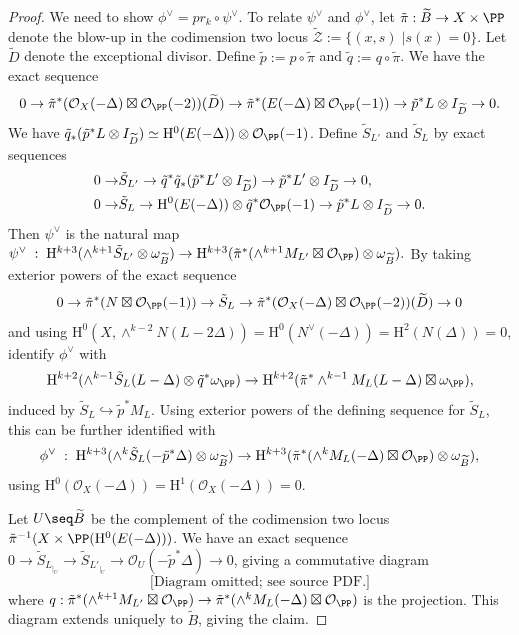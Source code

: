 \begin{proof}
We need to show $\phi^{\vee}=pr_k \circ \psi^{\vee}$. To relate $\psi^{\vee}$ and $\phi^{\vee}$, let $\tilde{\pi}: \widetilde{B} \to X \times \PP$ denote the blow-up in the codimension two locus $\widetilde{\mathcal{Z}}:=\{ (x,s) \; | s(x)=0 \}$. Let $\widetilde{D}$ denote the exceptional divisor. Define $\tilde{p}:=p \circ \tilde{\pi}$ and $\tilde{q}:=q \circ \tilde{\pi}$. We have the exact sequence
$$0 \to \tilde{\pi}^*(\mathcal{O}_X(-\Delta) \boxtimes \mathcal{O}_{\PP}(-2))(\widetilde{D}) \to \tilde{\pi}^*(E(-\Delta) \boxtimes \mathcal{O}_{\PP}(-1)) \to {\tilde{p}}^* L \otimes I_{\widetilde{D}} \to 0.$$
We have $\tilde{q}_*({\tilde{p}}^* L \otimes I_{\widetilde{D}}) \simeq \mathrm{H}^0(E(-\Delta)) \otimes \mathcal{O}_{\PP}(-1)$. Define $\tilde{S}_{L'}$ and $\tilde{S}_L$ by exact sequences
{\small{\begin{align*}
0 \to &\tilde{S}_{L'} \to {\tilde{q}}^*{\tilde{q}}_*({\tilde{p}}^* {L'} \otimes I_{\widetilde{D}})  \to {\tilde{p}}^* L' \otimes I_{\widetilde{D}} \to 0, \\
0 \to &\tilde{S}_L \to \mathrm{H}^0(E(-\Delta)) \otimes {\tilde{q}}^*\mathcal{O}_{\PP}(-1) \to {\tilde{p}}^* L \otimes I_{\widetilde{D}} \to 0.
\end{align*}}}
Then $\psi^{\vee}$ is the natural map $\psi^{\vee} \; : \; \mathrm{H}^{k+3}(\wedge^{k+1}\tilde{S}_{L'} \otimes \omega_{\widetilde{B}}) \to \mathrm{H}^{k+3}(\tilde{\pi}^*(\wedge^{k+1}M_{L'} \boxtimes \mathcal{O}_{\PP}) \otimes \omega_{\widetilde{B}}).$
By taking exterior powers of the exact sequence
$$0 \to \tilde{\pi}^*(N \boxtimes \mathcal{O}_{\PP}(-1)) \to \tilde{S}_L \to \tilde{\pi}^* (\mathcal{O}_X(-\Delta) \boxtimes \mathcal{O}_{\PP}(-2))(\widetilde{D}) \to 0$$
and using $\mathrm{H}^0(X,\wedge^{k-2}N(L-2\Delta))=\mathrm{H}^0(N^{\vee}(-\Delta))=\mathrm{H}^2(N(\Delta))=0$, identify $\phi^{\vee}$ with
$$\mathrm{H}^{k+2}(\wedge^{k-1} \tilde{S}_L (L-\Delta) \otimes {\tilde{q}}^* \omega_{\PP}) \to \mathrm{H}^{k+2}(\tilde{\pi}^*\wedge^{k-1}M_L (L-\Delta) \boxtimes \omega_{\PP}),$$
induced by $\tilde{S}_L \hookrightarrow \tilde{p}^* M_L$. Using exterior powers of the defining sequence for $\tilde{S}_L$, this can be further identified with
$$\phi^{\vee} \; : \; \mathrm{H}^{k+3}(\wedge^k \tilde{S}_L(-{\tilde{p}}^*\Delta) \otimes \omega_{\widetilde{B}}) \to \mathrm{H}^{k+3}(\tilde{\pi}^*(\wedge^k M_L(-\Delta) \boxtimes \mathcal{O}_{\PP}) \otimes \omega_{\widetilde{B}}),$$
using $\mathrm{H}^0(\mathcal{O}_X(-\Delta))=\mathrm{H}^1(\mathcal{O}_X(-\Delta))=0$.


Let $U \seq \widetilde{B}$ be the complement of the codimension two locus $\tilde{\pi}^{-1}(X \times \PP(\mathrm{H}^0(E(-\Delta)))$. We have an exact sequence
$0 \to \tilde{S}_{L_{|_U}} \to \tilde{S}_{L'_{|_U}} \to \mathcal{O}_U(-\tilde{p}^*\Delta) \to 0$, giving a commutative diagram
{\small{
$$\text{[Diagram omitted; see source PDF.]}$$
}}
where $q: \tilde{\pi}^*(\wedge^{k+1}M_{L'} \boxtimes \mathcal{O}_{\PP}) \to \tilde{\pi}^*(\wedge^k M_L(-\Delta) \boxtimes \mathcal{O}_{\PP})$ is the projection. This diagram extends uniquely to $\widetilde{B}$, giving the claim. \end{proof}
